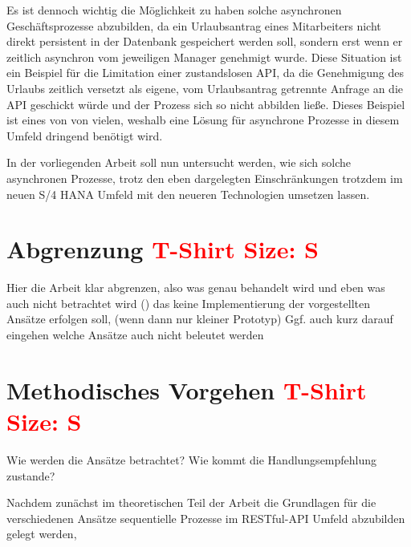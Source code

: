 Es ist dennoch wichtig die Möglichkeit zu haben solche asynchronen Geschäftsprozesse abzubilden, da \zB ein Urlaubsantrag eines Mitarbeiters nicht direkt persistent in der Datenbank gespeichert werden soll, sondern erst wenn er zeitlich asynchron vom jeweiligen Manager genehmigt wurde. Diese Situation ist ein Beispiel für die Limitation einer zustandslosen API, da die Genehmigung des Urlaubs zeitlich versetzt als eigene, vom Urlaubsantrag getrennte Anfrage an die API geschickt würde und der Prozess sich so nicht abbilden ließe. Dieses Beispiel ist eines von von vielen, weshalb eine Lösung für asynchrone Prozesse in diesem Umfeld dringend benötigt wird.  

In der vorliegenden Arbeit soll nun untersucht werden, wie sich solche asynchronen Prozesse, trotz den eben dargelegten Einschränkungen trotzdem im neuen S/4 HANA Umfeld mit den neueren Technologien umsetzen lassen.

\section{Abgrenzung \textcolor{red}{T-Shirt Size: S}}

Hier die Arbeit klar abgrenzen, also was genau behandelt wird und eben was auch nicht betrachtet wird (\zB) das keine Implementierung der vorgestellten Ansätze erfolgen soll, (wenn dann nur kleiner Prototyp)
Ggf. auch kurz darauf eingehen welche Ansätze auch nicht beleutet werden



\section{Methodisches Vorgehen \textcolor{red}{T-Shirt Size: S}}

Wie werden die Ansätze betrachtet? Wie kommt die Handlungsempfehlung zustande?

Nachdem zunächst im theoretischen Teil der Arbeit die Grundlagen für die verschiedenen Ansätze sequentielle Prozesse im RESTful-API Umfeld abzubilden gelegt werden, 